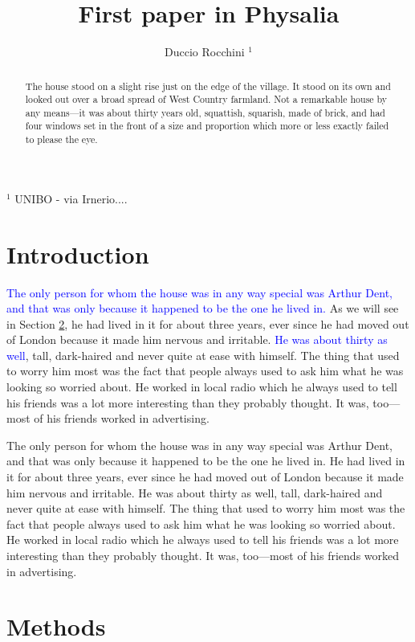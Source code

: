 \documentclass[a4paper, 12pt]{article}
\title{First paper in Physalia}
\author{Duccio Rocchini $^1$}
\date{ }
\newcommand{\tb}{\textcolor{blue}}
\begin{document}
\maketitle

$^1$ UNIBO - via Irnerio....

\tableofcontents

\begin{abstract}
The house stood on a slight rise just on the edge of the village. It stood on its own and looked out over a broad spread of West Country farmland. Not a remarkable house by any means—it was about thirty years old, squattish, squarish, made of brick, and had four windows set in the front of a size and proportion which more or less exactly failed to please the eye.
\end{abstract}

\section{Introduction} %

\tb{The only person for whom the house was in any way special was Arthur Dent, and that was only because it happened to be the one he lived in.} As we will see in Section \ref{sec:methods}, he had lived in it for about three years, ever since he had moved out of London because it made him nervous and irritable. \tb{He was about thirty as well}, tall, dark-haired and never quite at ease with himself. The thing that used to worry him most was the fact that people always used to ask him what he was looking so worried about. He worked in local radio which he always used to tell his friends was a lot more interesting than they probably thought. It was, too—most of his friends worked in advertising.

The only person for whom the house was in any way special was Arthur Dent, and that was only because it happened to be the one he lived in. He had lived in it for about three years, ever since he had moved out of London because it made him nervous and irritable. He was about thirty as well, tall, dark-haired and never quite at ease with himself. The thing that used to worry him most was the fact that people always used to ask him what he was looking so worried about. He worked in local radio which he always used to tell his friends was a lot more interesting than they probably thought. It was, too—most of his friends worked in advertising.

\section{Methods}\label{sec:methods}
\end{document}
